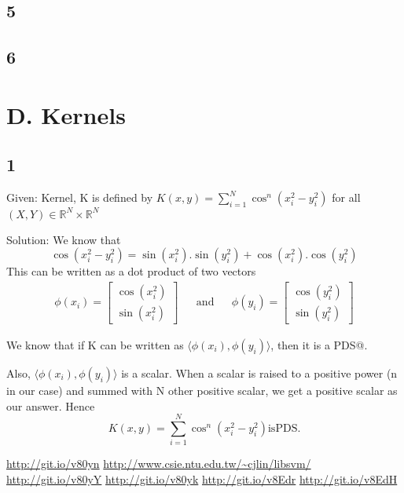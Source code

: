 \documentclass{article}
\begin{document}

\subsection*{5}
\subsection*{6}

\section*{D. Kernels}
\subsection*{1}
\begin{description}
  \item{Given:} Kernel, K is defined by \(K(x,y) = \sum_{i=1}^{N} \cos^{n} (x_{i}^{2} - y_{i}^{2} )\) for all \((X, Y) \in \mathbb{R}^{N} \times \mathbb{R}^{N} \) 
  \item{Solution:}  We know that
    \begin{equation}
      \cos (x_{i}^{2} - y_{i}^{2}) = \sin (x_{i}^{2}).\sin (y_{i}^{2}) + \cos (x_{i}^{2}).\cos (y_{i}^{2})
    \end{equation}
    This can be written as a dot product of two vectors 
    \begin{align}
    \phi(x_{i}) = \begin{bmatrix} \cos (x_{i}^{2}) \\ \sin (x_{i}^{2}) \end{bmatrix} && \mathrm{and} &&
    \phi(y_{i}) = \begin{bmatrix} \cos (y_{i}^{2}) \\ \sin (y_{i}^{2}) \end{bmatrix}
    \end{align}

    We know that if K can be written as \( \langle \phi(x_{i}), \phi(y_{i}) \rangle \), then it is a PDS@.

    Also, \( \langle \phi(x_{i}), \phi(y_{i}) \rangle \) is a scalar.  When a scalar is raised to a positive power (n in our case) and summed with N other positive scalar, we get a positive scalar as our answer.  Hence
    \begin{equation*}
      K(x,y) = \sum_{i=1}^{N} \cos^{n} (x_{i}^{2} - y_{i}^{2} ) \mathrm{is PDS.}
    \end{equation*}
\end{description}

\begin{thebibliography}{1}
   \url{http://git.io/v80yn}
   \url{http://www.csie.ntu.edu.tw/~cjlin/libsvm/}
   \url{http://git.io/v80yY}
   \url{http://git.io/v80yk}
   \url{http://git.io/v8Edr}
   \url{http://git.io/v8EdH}
\end{thebibliography}
\end{document}
